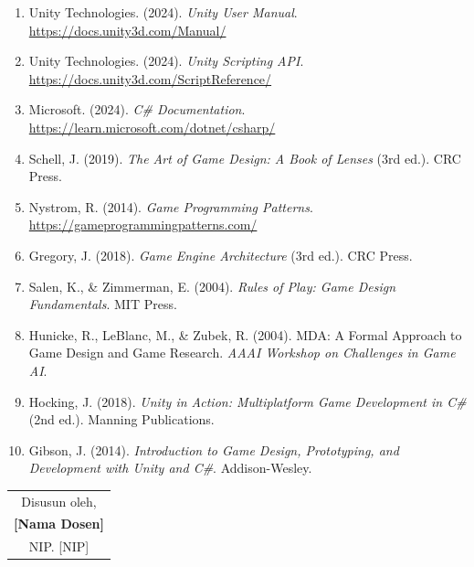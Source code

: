 \documentclass[12pt,a4paper]{article}
\begin{document}
\begin{enumerate}[leftmargin=*]
  \item Unity Technologies. (2024). \textit{Unity User Manual}. \url{https://docs.unity3d.com/Manual/}
  
  \item Unity Technologies. (2024). \textit{Unity Scripting API}. \url{https://docs.unity3d.com/ScriptReference/}
  
  \item Microsoft. (2024). \textit{C\# Documentation}. \url{https://learn.microsoft.com/dotnet/csharp/}
  
  \item Schell, J. (2019). \textit{The Art of Game Design: A Book of Lenses} (3rd ed.). CRC Press.
  
  \item Nystrom, R. (2014). \textit{Game Programming Patterns}. \url{https://gameprogrammingpatterns.com/}
  
  \item Gregory, J. (2018). \textit{Game Engine Architecture} (3rd ed.). CRC Press.
  
  \item Salen, K., \& Zimmerman, E. (2004). \textit{Rules of Play: Game Design Fundamentals}. MIT Press.
  
  \item Hunicke, R., LeBlanc, M., \& Zubek, R. (2004). MDA: A Formal Approach to Game Design and Game Research. \textit{AAAI Workshop on Challenges in Game AI}.
  
  \item Hocking, J. (2018). \textit{Unity in Action: Multiplatform Game Development in C\#} (2nd ed.). Manning Publications.
  
  \item Gibson, J. (2014). \textit{Introduction to Game Design, Prototyping, and Development with Unity and C\#}. Addison-Wesley.
\end{enumerate}

\vspace{1cm}

\begin{flushright}
\begin{tabular}{c}
Disusun oleh,\\[2cm]
\textbf{[Nama Dosen]}\\
NIP. [NIP]
\end{tabular}
\end{flushright}
\end{document}
